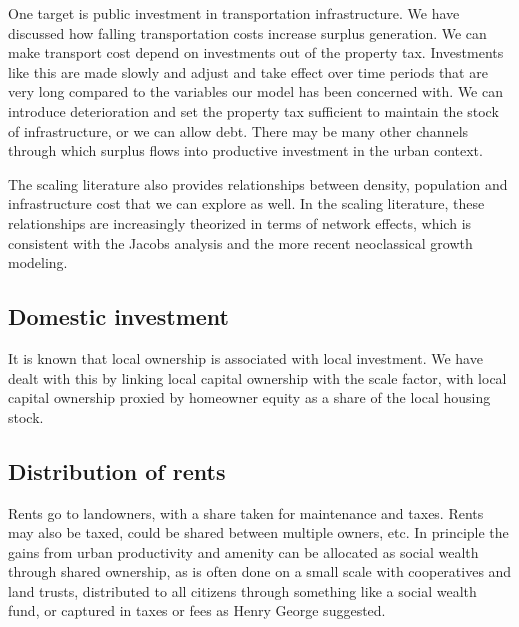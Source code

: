 One target is public investment in transportation infrastructure. We have discussed how falling transportation costs increase surplus generation.  We can make transport cost depend on investments out of the property tax. Investments like this are made slowly and adjust and take effect over time periods that are very long compared to the variables our model has been concerned with. We can introduce deterioration and set the property tax sufficient to maintain the stock of infrastructure,  or we can allow debt. 
There may be many other channels through which surplus flows into productive investment in the urban context. 

The scaling literature also provides relationships between density, population and infrastructure cost that we can explore as well. In the scaling literature, these relationships are increasingly theorized in terms of network effects, which is consistent with the Jacobs analysis and the more recent neoclassical growth modeling.


\subsection{Domestic investment}
 It is known that local ownership is associated with local investment. We have dealt with this by linking local capital ownership with the scale factor, with local capital ownership proxied by homeowner equity as a share of the local housing stock.

\subsection{Distribution of rents}
Rents go to landowners, with a share taken for maintenance and taxes.
Rents may also be taxed, could be shared between multiple owners, etc.
In principle the gains from urban productivity and amenity can be allocated as social wealth through shared ownership, as is often done on a small scale with cooperatives and land trusts, distributed to all citizens through something like a social wealth fund, or captured in taxes or fees as Henry George suggested. 



